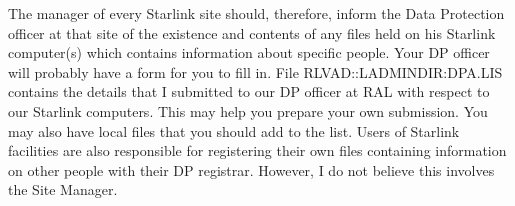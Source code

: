 The manager of every Starlink site should, therefore, inform the Data
Protection officer at that site of the existence and contents of any files
held on his Starlink computer(s) which contains information about specific
people.
Your DP officer will probably have a form for you to fill in.
File RLVAD::LADMINDIR:DPA.LIS contains the details that I submitted to our DP
officer at RAL with respect to our Starlink computers.
This may help you prepare your own submission.
You may also have local files that you should add to the list.
Users of Starlink facilities are also responsible for registering their
own files containing information on other people with their DP registrar.
However, I do not believe this involves the Site Manager.


